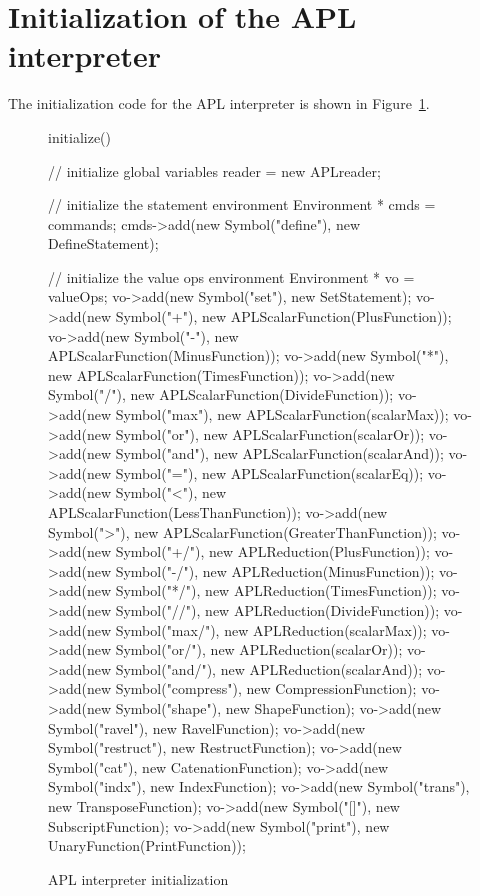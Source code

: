 \section{Initialization of the APL interpreter}

The initialization code for the APL interpreter is shown in
Figure~\ref{chap3init}.

\begin{figure}
\begin{cprog}
initialize()
{

	// initialize global variables
	reader = new APLreader;

	// initialize the statement environment
	Environment * cmds = commands;
	cmds->add(new Symbol("define"), new DefineStatement);

	// initialize the value ops environment
	Environment * vo = valueOps;
	vo->add(new Symbol("set"), new SetStatement);
	vo->add(new Symbol("+"), new APLScalarFunction(PlusFunction));
	vo->add(new Symbol("-"), new APLScalarFunction(MinusFunction));
	vo->add(new Symbol("*"), new APLScalarFunction(TimesFunction));
	vo->add(new Symbol("/"), new APLScalarFunction(DivideFunction));
	vo->add(new Symbol("max"), new APLScalarFunction(scalarMax));
	vo->add(new Symbol("or"), new APLScalarFunction(scalarOr));
	vo->add(new Symbol("and"), new APLScalarFunction(scalarAnd));
	vo->add(new Symbol("="), new APLScalarFunction(scalarEq));
	vo->add(new Symbol("<"), new APLScalarFunction(LessThanFunction));
	vo->add(new Symbol(">"), new APLScalarFunction(GreaterThanFunction));
	vo->add(new Symbol("+/"), new APLReduction(PlusFunction));
	vo->add(new Symbol("-/"), new APLReduction(MinusFunction));
	vo->add(new Symbol("*/"), new APLReduction(TimesFunction));
	vo->add(new Symbol("//"), new APLReduction(DivideFunction));
	vo->add(new Symbol("max/"), new APLReduction(scalarMax));
	vo->add(new Symbol("or/"), new APLReduction(scalarOr));
	vo->add(new Symbol("and/"), new APLReduction(scalarAnd));
	vo->add(new Symbol("compress"), new CompressionFunction);
	vo->add(new Symbol("shape"), new ShapeFunction);
	vo->add(new Symbol("ravel"), new RavelFunction);
	vo->add(new Symbol("restruct"), new RestructFunction);
	vo->add(new Symbol("cat"), new CatenationFunction);
	vo->add(new Symbol("indx"), new IndexFunction);
	vo->add(new Symbol("trans"), new TransposeFunction);
	vo->add(new Symbol("[]"), new SubscriptFunction);
	vo->add(new Symbol("print"), new UnaryFunction(PrintFunction));
}
\end{cprog}
\caption{APL interpreter initialization}\label{chap3init}
\end{figure}
